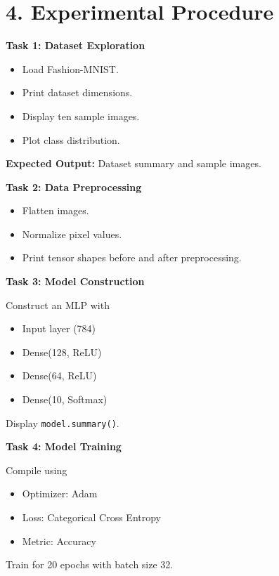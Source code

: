 \documentclass[11pt]{article}
\begin{document}
\section*{4. Experimental Procedure}

\textbf{Task 1: Dataset Exploration}
\begin{itemize}
\item Load Fashion-MNIST.
\item Print dataset dimensions.
\item Display ten sample images.
\item Plot class distribution.
\end{itemize}

\textbf{Expected Output:}
Dataset summary and sample images.

\bigskip

\textbf{Task 2: Data Preprocessing}

\begin{itemize}
\item Flatten images.
\item Normalize pixel values.
\item Print tensor shapes before and after preprocessing.
\end{itemize}

\bigskip

\textbf{Task 3: Model Construction}

Construct an MLP with

\begin{itemize}
\item Input layer (784)
\item Dense(128, ReLU)
\item Dense(64, ReLU)
\item Dense(10, Softmax)
\end{itemize}

Display \texttt{model.summary()}.

\bigskip

\textbf{Task 4: Model Training}

Compile using

\begin{itemize}
\item Optimizer: Adam
\item Loss: Categorical Cross Entropy
\item Metric: Accuracy
\end{itemize}

Train for 20 epochs with batch size 32.
\end{document}
